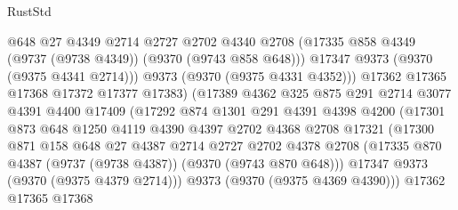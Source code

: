 \begin{lexlean}{RustStd}
\begin{coremodule}
{\begin{coremodule}
{{{{{{{{{{{{{{{{{{{{{{{{{{{{{{{{{{{{{{{                              @648
                              @27
                              @4349
                              @2714
                              @2727
                              @2702
                              @4340
                              @2708
                              (@17335 @858 @4349 (@9737 (@9738 @4349)) (@9370 (@9743 @858 @648)))
                              @17347
                              @9373
                              (@9370 (@9375 @4341 @2714)))
                            @9373
                            (@9370 (@9375 @4331 @4352)))
                          @17362
                          @17365
                          @17368
                          @17372
                          @17377
                          @17383)
                        (@17389
                          @4362
                          @325
                          @875
                          @291
                          @2714
                          @3077
                          @4391
                          @4400
                          @17409
                          (@17292
                            @874
                            @1301
                            @291
                            @4391
                            @4398
                            @4200
                            (@17301
                              @873
                              @648
                              @1250
                              @4119
                              @4390
                              @4397
                              @2702
                              @4368
                              @2708
                              @17321
                              (@17300
                                @871
                                @158
                                @648
                                @27
                                @4387
                                @2714
                                @2727
                                @2702
                                @4378
                                @2708
                                (@17335 @870 @4387 (@9737 (@9738 @4387)) (@9370 (@9743 @870 @648)))
                                @17347
                                @9373
                                (@9370 (@9375 @4379 @2714)))
                              @9373
                              (@9370 (@9375 @4369 @4390)))
                            @17362
                            @17365
                            @17368
}}}}}}}}}}}}}}}}}}}}}}}}}}}}}}}}}}}}}}}
\end{coremodule}}
\end{coremodule}
\end{lexlean}
